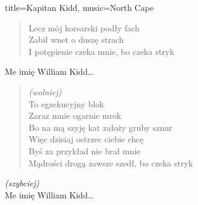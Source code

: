 \begin{song}[verse/numbered, remember-chords, align-chords={l}]{title={Kapitan Kidd}, music={North Cape}}
\begin{multicols}{2}
\begin{verse}
        Lecz mój korsarski podły fach \\
        Zabił wnet o duszę strach \\
        I potępienie czeka mnie, bo czeka stryk
    \end{verse}
    \begin{chorus}
        Me imię William Kidd\ldots
    \end{chorus}
    \begin{verse}
        \textit{(wolniej)} \\
        To egzekucyjny blok \\
        Zaraz mnie ogarnie mrok \\
        Bo na mą szyję kat założy gruby sznur \\
        Więc dzisiaj ostrzec ciebie chcę \\
        Byś za przykład nie brał mnie \\
        Mądrości drogą zawsze szedł, bo czeka stryk
    \end{verse}
    \begin{chorus}
        \textit{(szybciej)} \\
        Me imię William Kidd\ldots
    \end{chorus}
\end{multicols}
\end{song}
